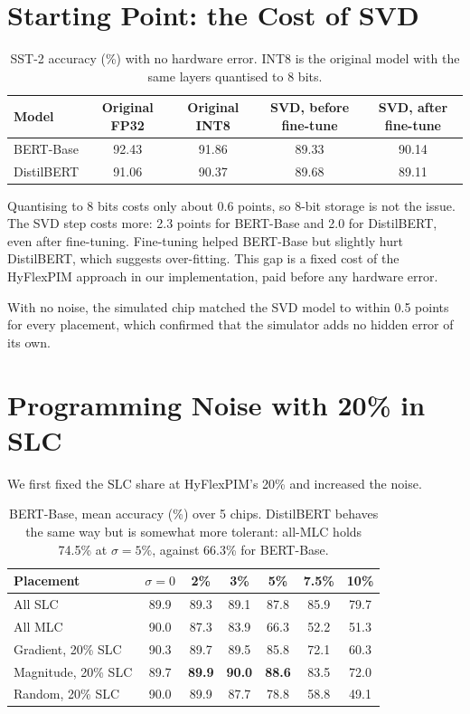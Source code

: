 \documentclass[10pt,a4paper]{article}
\newcommand{\best}[1]{\textcolor{cmag}{\textbf{#1}}}
\begin{document}
\section{Starting Point: the Cost of SVD}

\begin{table}[h]
\centering\small
\begin{tabular}{@{}lcccc@{}}
\toprule
Model & Original FP32 & Original INT8 & SVD, before fine-tune & SVD, after fine-tune \\
\midrule
BERT-Base  & 92.43 & 91.86 & 89.33 & 90.14 \\
DistilBERT & 91.06 & 90.37 & 89.68 & 89.11 \\
\bottomrule
\end{tabular}
\caption{SST-2 accuracy (\%) with no hardware error. INT8 is the original model with the same layers
quantised to 8 bits.}
\end{table}

Quantising to 8 bits costs only about 0.6 points, so 8-bit storage is not the issue. The SVD step costs
more: 2.3 points for BERT-Base and 2.0 for DistilBERT, even after fine-tuning. Fine-tuning helped
BERT-Base but slightly hurt DistilBERT, which suggests over-fitting. This gap is a fixed cost of the
HyFlexPIM approach in our implementation, paid before any hardware error.

With no noise, the simulated chip matched the SVD model to within 0.5 points for every placement, which
confirmed that the simulator adds no hidden error of its own.

\section{Programming Noise with 20\% in SLC}
We first fixed the SLC share at HyFlexPIM's 20\% and increased the noise.

\begin{table}[h]
\centering\small
\begin{tabular}{@{}lcccccc@{}}
\toprule
Placement & $\sigma=0$ & 2\% & 3\% & 5\% & 7.5\% & 10\% \\
\midrule
All SLC & 89.9 & 89.3 & 89.1 & 87.8 & 85.9 & 79.7 \\
All MLC & 90.0 & 87.3 & 83.9 & 66.3 & 52.2 & 51.3 \\
\midrule
Gradient, 20\% SLC  & 90.3 & 89.7 & 89.5 & 85.8 & 72.1 & 60.3 \\
Magnitude, 20\% SLC & 89.7 & \best{89.9} & \best{90.0} & \best{88.6} & 83.5 & 72.0 \\
Random, 20\% SLC    & 90.0 & 89.9 & 87.7 & 78.8 & 58.8 & 49.1 \\
\bottomrule
\end{tabular}
\caption{BERT-Base, mean accuracy (\%) over 5 chips. DistilBERT behaves the same way but is somewhat more
tolerant: all-MLC holds 74.5\% at $\sigma=5\%$, against 66.3\% for BERT-Base.}
\end{table}
\end{document}
